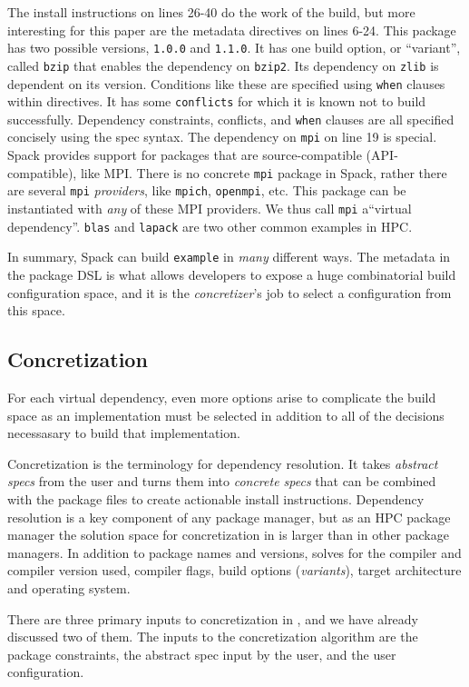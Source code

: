 The install instructions on lines 26-40 do the work of the build, but more interesting
for this paper are the metadata directives on lines 6-24. This package has two possible
versions, {\tt 1.0.0} and {\tt 1.1.0}. It has one build option, or ``variant'', called
{\tt bzip} that enables the dependency on {\tt bzip2}. Its dependency on {\tt zlib} is
dependent on its version. Conditions like these are specified using {\tt when} clauses
within directives. It has some {\tt conflicts} for which it is known not to build
successfully. Dependency constraints, conflicts, and {\tt when} clauses are all
specified concisely using the  spec syntax.
%
The dependency on {\tt mpi} on line 19 is special. Spack provides support for packages
that are source-compatible (API-compatible), like MPI. There is no concrete {\tt mpi}
package in Spack, rather there are several {\tt mpi} {\it providers}, like {\tt mpich},
{\tt openmpi}, etc. This package can be instantiated with {\it any} of these MPI
providers. We thus call {\tt mpi} a``virtual dependency''. {\tt blas} and {\tt lapack}
are two other common examples in HPC.

In summary, Spack can build {\tt example} in {\it many} different ways. The metadata in
the package DSL is what allows developers to expose a huge combinatorial build
configuration space, and it is the {\it concretizer}'s job to select a configuration
from this space.

\subsection{Concretization}


For each virtual
dependency, even more options arise to complicate the build space as an implementation
must be selected in addition to all of the decisions necessasary to build that
implementation.

Concretization is the \spack terminology for dependency resolution. It takes \emph{abstract specs} from the user and turns them into \emph{concrete specs} that can be combined with the package files to create actionable install instructions.
Dependency resolution is a key component of any package manager, but as an HPC package manager the solution space for concretization in \spack is larger than in other package managers.
In addition to package names and versions, \spack solves for the compiler and compiler version used, compiler flags, build options (\emph{variants}), target architecture and operating system.

There are three primary inputs to concretization in \spack, and we have already discussed two of them. The inputs to the concretization algorithm are the package constraints, the abstract spec input by the user, and the user configuration.

